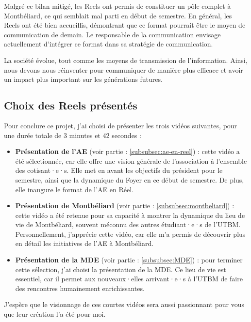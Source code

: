 Malgré ce bilan mitigé, les Reels ont permis de constituer un pôle complet à Montbéliard, ce qui semblait mal parti en début de semestre.
En général, les Reels ont été bien accueillis, démontrant que ce format pourrait être le moyen de communication de demain.
Le responsable de la communication envisage actuellement d'intégrer ce format dans sa stratégie de communication.

La société évolue, tout comme les moyens de transmission de l'information.
Ainsi, nous devons nous réinventer pour communiquer de manière plus efficace et avoir un impact plus important sur les générations futures.


\subsection{Choix des Reels présentés}\label{subsec:choix-des-reels-presentes}

Pour conclure ce projet, j'ai choisi de présenter les trois vidéos suivantes, pour une durée totale de 3 minutes et 42 secondes :

\begin{itemize}
    \item \textbf{Présentation de l'\gls{AE}} (voir partie : \ref{subsubsec:ae-en-reel}) : cette vidéo a été sélectionnée, car elle offre une vision générale de l'association à l'ensemble des cotisant·e·s.
    Elle met en avant les objectifs du président pour le semestre, ainsi que la dynamique du Foyer en ce début de semestre.
    De plus, elle inaugure le format de l'\gls{AE} en Réel.
    \item \textbf{Présentation de Montbéliard} (voir partie : \ref{subsubsec:montbeliard}) : cette vidéo a été retenue pour sa capacité à montrer la dynamique du lieu de vie de Montbéliard, souvent méconnu des autres étudiant·e·s de l'\gls{UTBM}.
    Personnellement, j'apprécie cette vidéo, car elle m'a permis de découvrir plus en détail les initiatives de l'\gls{AE} à Montbéliard.
    \item \textbf{Présentation de la MDE} (voir partie : \ref{subsubsec:MDE}) : pour terminer cette sélection, j'ai choisi la présentation de la MDE. Ce lieu de vie est essentiel, car il permet aux nouveaux·elles arrivant·e·s à l'\gls{UTBM} de faire des rencontres humainement enrichissantes.
\end{itemize}

J'espère que le visionnage de ces courtes vidéos sera aussi passionnant pour vous que leur création l'a été pour moi.